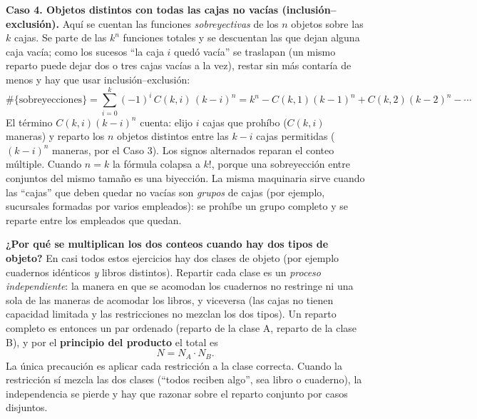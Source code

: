 \documentclass[11pt]{article}
\begin{document}
\begin{teo}
\medskip
\textbf{Caso 4. Objetos distintos con todas las cajas no vacías (inclusión--exclusión).}
Aquí se cuentan las funciones \emph{sobreyectivas} de los $n$ objetos sobre las $k$ cajas. Se parte de las $k^n$ funciones totales y se descuentan las que dejan alguna caja vacía; como los sucesos ``la caja $i$ quedó vacía'' se traslapan (un mismo reparto puede dejar dos o tres cajas vacías a la vez), restar sin más contaría de menos y hay que usar inclusión--exclusión:
\[
\#\{\text{sobreyecciones}\}=\sum_{i=0}^{k}(-1)^i\,C(k,i)\,(k-i)^n
=k^n-C(k,1)(k-1)^n+C(k,2)(k-2)^n-\cdots
\]
El término $C(k,i)(k-i)^n$ cuenta: elijo $i$ cajas que prohíbo ($C(k,i)$ maneras) y reparto los $n$ objetos distintos entre las $k-i$ cajas permitidas ($(k-i)^n$ maneras, por el Caso 3). Los signos alternados reparan el conteo múltiple. Cuando $n=k$ la fórmula colapsa a $k!$, porque una sobreyección entre conjuntos del mismo tamaño es una biyección. La misma maquinaria sirve cuando las ``cajas'' que deben quedar no vacías son \emph{grupos} de cajas (por ejemplo, sucursales formadas por varios empleados): se prohíbe un grupo completo y se reparte entre los empleados que quedan.

\medskip
\textbf{¿Por qué se multiplican los dos conteos cuando hay dos tipos de objeto?}
En casi todos estos ejercicios hay dos clases de objeto (por ejemplo cuadernos idénticos \emph{y} libros distintos). Repartir cada clase es un \emph{proceso independiente}: la manera en que se acomodan los cuadernos no restringe ni una sola de las maneras de acomodar los libros, y viceversa (las cajas no tienen capacidad limitada y las restricciones no mezclan los dos tipos). Un reparto completo es entonces un par ordenado (reparto de la clase A, reparto de la clase B), y por el \textbf{principio del producto} el total es
\[
N=N_A\cdot N_B .
\]
La única precaución es aplicar cada restricción a la clase correcta. Cuando la restricción sí mezcla las dos clases (``todos reciben algo'', sea libro o cuaderno), la independencia se pierde y hay que razonar sobre el reparto conjunto por casos disjuntos.
\end{teo}
\end{document}

